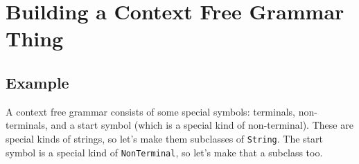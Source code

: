 \documentclass{article}
\begin{document}
\section{Building a Context Free Grammar Thing}
\subsection{Example}
A context free grammar consists of some special symbols: terminals, non-terminals, and a start symbol (which is a special kind of non-terminal). These are special kinds of strings, so let's make them subclasses of \verb|String|. The start symbol is a special kind of \verb|NonTerminal|, so let's make that a subclass too. 
\end{document}
